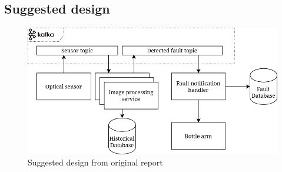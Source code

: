 \subsection{Suggested design}
\label{appendix:figure3}

\begin{figure}[h]
    \centering
    \includegraphics[scale = 0.4]{appendix/appendixA.png}
    \caption{Suggested design from original report}
    \label{fig:appendixA}
\end{figure}